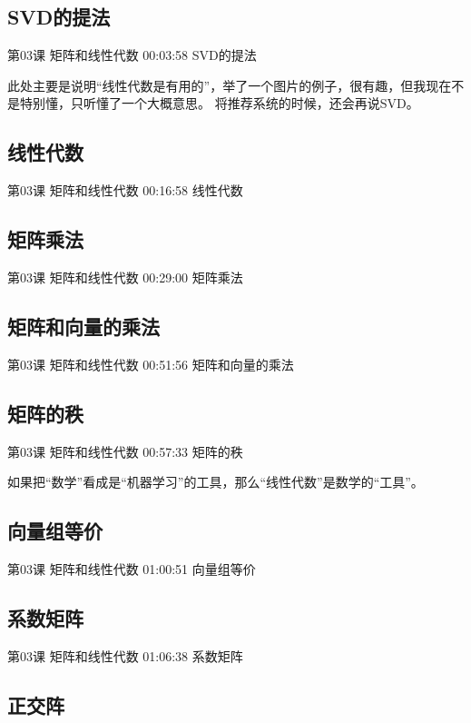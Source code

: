 \documentclass[UTF8]{ctexart}
\begin{document}
\subsection{SVD的提法}

第03课 矩阵和线性代数 00:03:58 SVD的提法

此处主要是说明“线性代数是有用的”，举了一个图片的例子，很有趣，但我现在不是特别懂，只听懂了一个大概意思。
将推荐系统的时候，还会再说SVD。

\subsection{线性代数}

第03课 矩阵和线性代数 00:16:58 线性代数

\subsection{矩阵乘法}

第03课 矩阵和线性代数 00:29:00 矩阵乘法

\subsection{矩阵和向量的乘法}

第03课 矩阵和线性代数 00:51:56 矩阵和向量的乘法

\subsection{矩阵的秩}

第03课 矩阵和线性代数 00:57:33 矩阵的秩

如果把“数学”看成是“机器学习”的工具，那么“线性代数”是数学的“工具”。

\subsection{向量组等价}

第03课 矩阵和线性代数 01:00:51 向量组等价

\subsection{系数矩阵}

第03课 矩阵和线性代数 01:06:38 系数矩阵

\subsection{正交阵}
\end{document}
